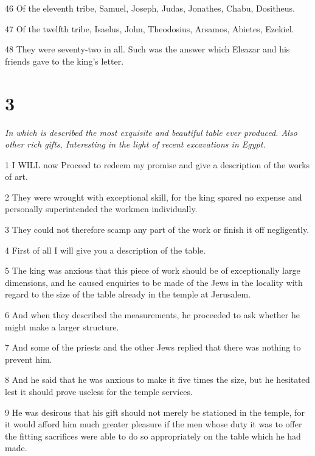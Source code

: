 \par 46 Of the eleventh tribe, Samuel, Joseph, Judas, Jonathes, Chabu, Dositheus.

\par 47 Of the twelfth tribe, Isaelus, John, Theodosius, Arsamos, Abietes, Ezekiel.

\par 48 They were seventy-two in all. Such was the answer which Eleazar and his friends gave to the king's letter.

\chapter{3}

\par \textit{In which is described the most exquisite and beautiful table ever produced. Also other rich gifts, Interesting in the light of recent excavations in Egypt.}

\par 1 I WILL now Proceed to redeem my promise and give a description of the works of art.

\par 2 They were wrought with exceptional skill, for the king spared no expense and personally superintended the workmen individually.

\par 3 They could not therefore scamp any part of the work or finish it off negligently.

\par 4 First of all I will give you a description of the table.

\par 5 The king was anxious that this piece of work should be of exceptionally large dimensions, and he caused enquiries to be made of the Jews in the locality with regard to the size of the table already in the temple at Jerusalem.

\par 6 And when they described the measurements, he proceeded to ask whether he might make a larger structure.

\par 7 And some of the priests and the other Jews replied that there was nothing to prevent him.

\par 8 And he said that he was anxious to make it five times the size, but he hesitated lest it should prove useless for the temple services.

\par 9 He was desirous that his gift should not merely be stationed in the temple, for it would afford him much greater pleasure if the men whose duty it was to offer the fitting sacrifices were able to do so appropriately on the table which he had made.

